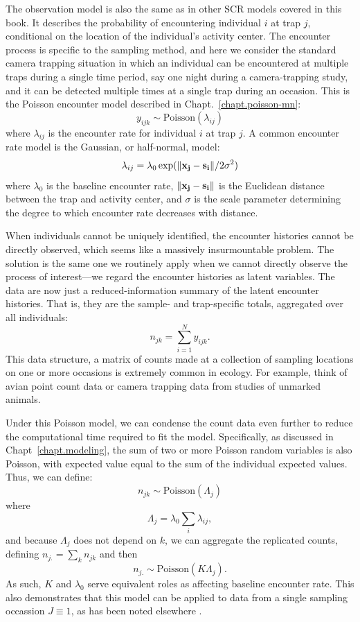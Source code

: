 The observation model is also the same as in other SCR models covered
in this book. It describes the probability of encountering individual
$i$ at trap $j$, conditional on the location of the individual's
activity center. The encounter process is specific to the
sampling method, and here we consider the standard camera trapping
situation in which an individual can be encountered at multiple traps
during a single time period, say one night during a camera-trapping
study, and it can be detected multiple times at a single trap during
an occasion. This is the Poisson encounter model described in
Chapt.~\ref{chapt.poisson-mn}:
\begin{equation}
 y_{ijk} \sim \mbox{Poisson}(\lambda_{ij})
\label{eq.latentPoisson}
\end{equation}
where $\lambda_{ij}$ is the encounter rate
for individual $i$ at trap $j$. A common encounter rate model is the
Gaussian, or half-normal, model:
\[
\lambda_{ij} = \lambda_0 \exp(\| {\bf x_j - s_i} \| / 2\sigma^2)
\]
where $\lambda_0$ is the baseline encounter rate, $\| {\bf x_j - s_i}
\|$ is the Euclidean distance between the trap and activity center, and $\sigma$ is the
scale parameter determining the degree to which encounter rate decreases with
distance.

When individuals cannot be uniquely identified, the encounter histories cannot
be directly observed, which seems like a massively insurmountable
problem. The solution is the same one we routinely apply when we
cannot directly observe the process of interest---we regard the
encounter histories as latent variables. The data are now just a
reduced-information summary of the latent encounter histories. That
is, they are the sample- and trap-specific totals, aggregated over all
individuals:
\[
n_{jk} = \sum_{i=1}^{N} y_{ijk}.
\]
This data structure, a matrix of counts made at a collection of
sampling locations on one or more occasions is extremely common in
ecology. For example, think of avian point count data or camera
trapping data from studies of unmarked animals.

Under this Poisson model, we can condense the count data even
further to reduce the computational time required to fit the
model. Specifically, as discussed in
Chapt~\ref{chapt.modeling}, the sum of two or more Poisson random
variables is also Poisson, with expected value equal to the sum of the
individual expected values.  Thus, we can define:
\begin{equation}
n_{jk} \sim \mbox{Poisson}( \Lambda_{j} )
\label{eq:nagg}
\end{equation}
where
\[
 \Lambda_{j} = \lambda_0 \sum_{i} \lambda_{ij},
\]
and because $\Lambda_j$ does not depend on $k$, we can
aggregate the replicated counts, defining
$n_{j.} = \sum_{k} n_{jk}$ and then
\[
 n_{j.} \sim \mbox{Poisson}( K \Lambda_{j} ).
\]
As such, $K$ and $\lambda_{0}$ serve equivalent roles as affecting
baseline encounter rate. This also demonstrates that this model can be
applied to data from a single sampling occassion $J \equiv 1$, as has
been noted elsewhere \citep{efford_etal:2009ecol}.


